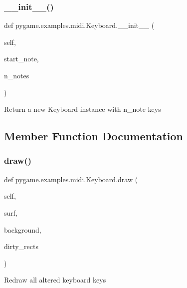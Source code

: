 \subsubsection{\texorpdfstring{\+\_\+\+\_\+init\+\_\+\+\_\+()}{\_\_init\_\_()}}
{\footnotesize\ttfamily def pygame.\+examples.\+midi.\+Keyboard.\+\_\+\+\_\+init\+\_\+\+\_\+ (\begin{DoxyParamCaption}\item[{}]{self,  }\item[{}]{start\+\_\+note,  }\item[{}]{n\+\_\+notes }\end{DoxyParamCaption})}

\begin{DoxyVerb}Return a new Keyboard instance with n_note keys\end{DoxyVerb}
 

\subsection{Member Function Documentation}
\mbox{\label{classpygame_1_1examples_1_1midi_1_1_keyboard_af9b304df79bd4360b1b78188b3958dcd}} 
\subsubsection{\texorpdfstring{draw()}{draw()}}
{\footnotesize\ttfamily def pygame.\+examples.\+midi.\+Keyboard.\+draw (\begin{DoxyParamCaption}\item[{}]{self,  }\item[{}]{surf,  }\item[{}]{background,  }\item[{}]{dirty\+\_\+rects }\end{DoxyParamCaption})}

\begin{DoxyVerb}Redraw all altered keyboard keys\end{DoxyVerb}
 \mbox{\label{classpygame_1_1examples_1_1midi_1_1_keyboard_a218c75e0ee10e3ec7554fbf82de06bec}} 
